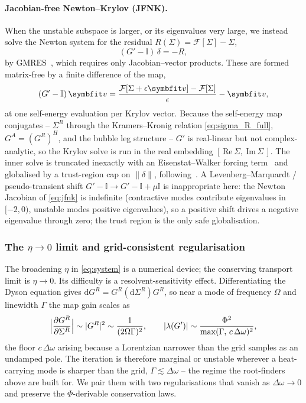 \paragraph{Jacobian-free Newton--Krylov (JFNK).}
When the unstable subspace is larger, or its eigenvalues very large, we instead
solve the Newton system for the residual $R(\Sigma)=\mathcal{F}[\Sigma]-\Sigma$,
\begin{equation}\label{eq:jfnk}
  (G'-\mathbb{I})\,\delta=-R,
\end{equation}
by GMRES~\cite{saad_gmres_1986}, which requires only Jacobian--vector products.
These are formed matrix-free by a finite difference of the map,
\begin{equation}\label{eq:jfnk_jv}
  (G'-\mathbb{I})\,\vc{v}
  =\frac{\mathcal{F}[\Sigma+\epsilon\vc{v}]-\mathcal{F}[\Sigma]}{\epsilon}-\vc{v},
\end{equation}
at one self-energy evaluation per Krylov vector. Because the self-energy map
conjugates -- $\Sigma^R$ through the Kramers--Kronig relation
\cref{eq:sigma_R_full}, $G^A=(G^R)^{H}$, and the bubble leg structure -- $G'$ is
real-linear but not complex-analytic, so the Krylov solve is run in the real
embedding $[\,\mathrm{Re}\,\Sigma,\ \mathrm{Im}\,\Sigma\,]$. The inner solve is
truncated inexactly with an Eisenstat--Walker forcing
term~\cite{eisenstat_choosing_1996} and globalised by a trust-region cap on
$\|\delta\|$, following~\citet{brown_hybrid_1990,kelley_iterative_1995}. A
Levenberg--Marquardt / pseudo-transient shift
$G'-\mathbb{I}\to G'-\mathbb{I}+\mu\mathbb{I}$ is inappropriate here: the Newton
Jacobian of \cref{eq:jfnk} is indefinite (contractive modes contribute
eigenvalues in $[-2,0)$, unstable modes positive eigenvalues), so a positive
shift drives a negative eigenvalue through zero; the trust region is the only
safe globalisation.

\subsubsection{The $\eta\to0$ limit and grid-consistent regularisation}
\label{sub:eta_zero}

The broadening $\eta$ in \cref{eq:system} is a numerical device; the conserving
transport limit is $\eta\to0$. Its difficulty is a resolvent-sensitivity effect.
Differentiating the Dyson equation gives
$\mathrm{d}G^R=G^R(\mathrm{d}\Sigma^R)G^R$, so near a mode of frequency $\Omega$
and linewidth $\Gamma$ the map gain scales as
\begin{equation}\label{eq:resolvent_gain}
  \Bigl|\frac{\partial G^R}{\partial\Sigma^R}\Bigr|\sim|G^R|^2\sim
  \frac{1}{(2\Omega\Gamma)^2},
  \qquad
  |\lambda(G')|\sim\frac{\Phi^2}{\max(\Gamma,\,c\,\Delta\omega)^2},
\end{equation}
the floor $c\,\Delta\omega$ arising because a Lorentzian narrower than the grid
samples as an undamped pole. The iteration is therefore marginal or unstable
wherever a heat-carrying mode is sharper than the grid,
$\Gamma\lesssim\Delta\omega$ -- the regime the root-finders above are built for.
We pair them with two regularisations that vanish as $\Delta\omega\to0$ and
preserve the $\Phi$-derivable conservation laws.

